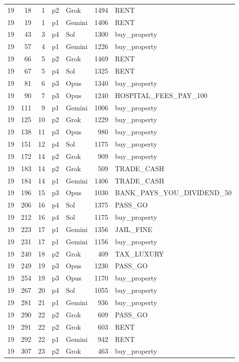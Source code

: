 \begin{longtable}{r r r l l r L{2.2in}}
19 & 18 & 1 & p2 & Grok & 1494 & RENT \\
19 & 19 & 1 & p1 & Gemini & 1406 & RENT \\
19 & 43 & 3 & p4 & Sol & 1300 & buy\_property \\
19 & 57 & 4 & p1 & Gemini & 1226 & buy\_property \\
19 & 66 & 5 & p2 & Grok & 1469 & RENT \\
19 & 67 & 5 & p4 & Sol & 1325 & RENT \\
19 & 81 & 6 & p3 & Opus & 1340 & buy\_property \\
19 & 90 & 7 & p3 & Opus & 1240 & HOSPITAL\_FEES\_PAY\_100 \\
19 & 111 & 9 & p1 & Gemini & 1006 & buy\_property \\
19 & 125 & 10 & p2 & Grok & 1229 & buy\_property \\
19 & 138 & 11 & p3 & Opus & 980 & buy\_property \\
19 & 151 & 12 & p4 & Sol & 1175 & buy\_property \\
19 & 172 & 14 & p2 & Grok & 909 & buy\_property \\
19 & 183 & 14 & p2 & Grok & 509 & TRADE\_CASH \\
19 & 184 & 14 & p1 & Gemini & 1406 & TRADE\_CASH \\
19 & 196 & 15 & p3 & Opus & 1030 & BANK\_PAYS\_YOU\_DIVIDEND\_50 \\
19 & 206 & 16 & p4 & Sol & 1375 & PASS\_GO \\
19 & 212 & 16 & p4 & Sol & 1175 & buy\_property \\
19 & 223 & 17 & p1 & Gemini & 1356 & JAIL\_FINE \\
19 & 231 & 17 & p1 & Gemini & 1156 & buy\_property \\
19 & 240 & 18 & p2 & Grok & 409 & TAX\_LUXURY \\
19 & 249 & 19 & p3 & Opus & 1230 & PASS\_GO \\
19 & 254 & 19 & p3 & Opus & 1170 & buy\_property \\
19 & 267 & 20 & p4 & Sol & 1055 & buy\_property \\
19 & 281 & 21 & p1 & Gemini & 936 & buy\_property \\
19 & 290 & 22 & p2 & Grok & 609 & PASS\_GO \\
19 & 291 & 22 & p2 & Grok & 603 & RENT \\
19 & 292 & 22 & p1 & Gemini & 942 & RENT \\
19 & 307 & 23 & p2 & Grok & 463 & buy\_property \\

\end{longtable}
